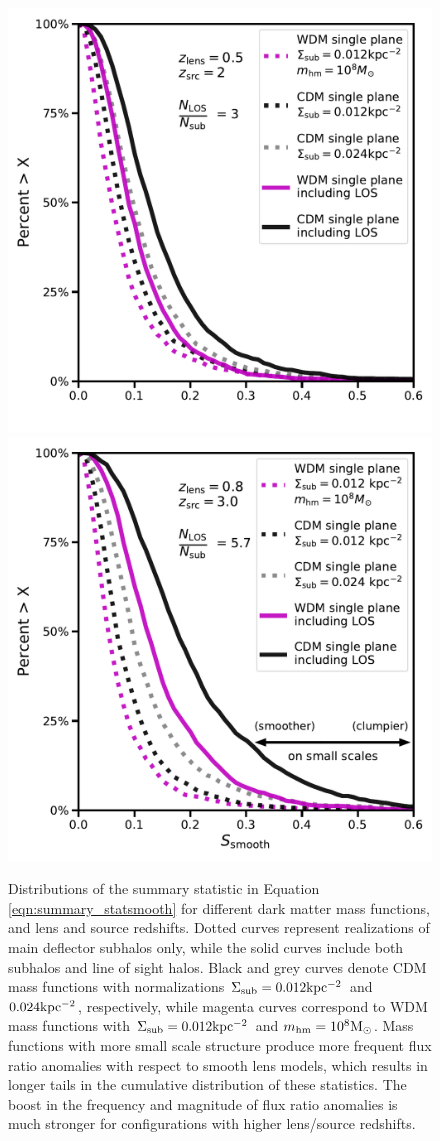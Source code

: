 \begin{figure}
	\centering
	\includegraphics[clip,trim=0cm 0cm 0cm
	0cm,width=.48\textwidth,keepaspectratio]{./figures_LOSforward/fluxratio_distributions_zclose.pdf}
	\includegraphics[clip,trim=0cm 0cm 0cm
	0cm,width=.48\textwidth,keepaspectratio]{./figures_LOSforward/fluxratio_distributions_zfar.pdf}
	\caption[Distributions of flux ratio anomalies as a function of lens and source redshift]{\label{fig:fluxdistributions} Distributions of the summary statistic in Equation \ref{eqn:summary_statsmooth} for different dark matter mass functions, and lens and source redshifts. Dotted curves represent realizations of main deflector subhalos only, while the solid curves include both subhalos and line of sight halos. Black and grey curves denote CDM mass functions with normalizations $\Sigma_{\rm{sub}} = 0.012 \rm{kpc^{-2}}$ and $0.024 \rm{kpc^{-2}}$, respectively, while magenta curves correspond to WDM mass functions with $\Sigma_{\rm{sub}} = 0.012 \rm{kpc^{-2}}$ and ${m_{\rm{hm}}} = 10^{8} {\rm{M}_{\odot}}$. Mass functions with more small scale structure produce more frequent flux ratio anomalies with respect to smooth lens models, which results in longer tails in the cumulative distribution of these statistics. The boost in the frequency and magnitude of flux ratio anomalies is much stronger for configurations with higher lens/source redshifts.}
\end{figure}

